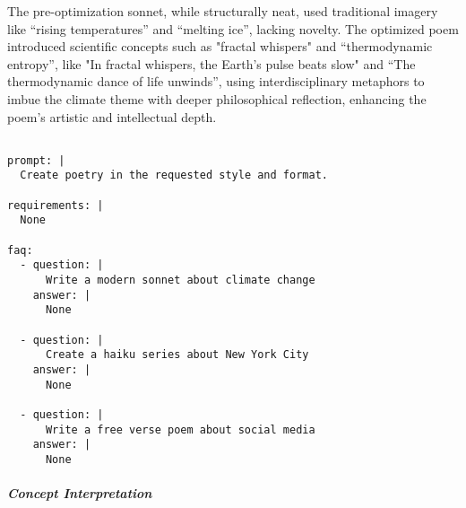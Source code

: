 The pre-optimization sonnet, while structurally neat, used traditional imagery like ``rising temperatures'' and ``melting ice'', lacking novelty. The optimized poem introduced scientific concepts such as "fractal whispers" and ``thermodynamic entropy'', like "In fractal whispers, the Earth's pulse beats slow" and ``The thermodynamic dance of life unwinds'', using interdisciplinary metaphors to imbue the climate theme with deeper philosophical reflection, enhancing the poem's artistic and intellectual depth.

\begin{tcolorbox}[title={\textbf{\small Iteration template on the BBH-navigate dataset}}, boxrule=2pt, arc=0mm, breakable]\begin{verbatim}

prompt: |
  Create poetry in the requested style and format.

requirements: |
  None

faq:
  - question: |
      Write a modern sonnet about climate change
    answer: |
      None

  - question: |
      Create a haiku series about New York City
    answer: |
      None

  - question: |
      Write a free verse poem about social media
    answer: |
      None

\end{verbatim}
\end{tcolorbox}

\subparagraph{Concept Interpretation} \mbox{} 

